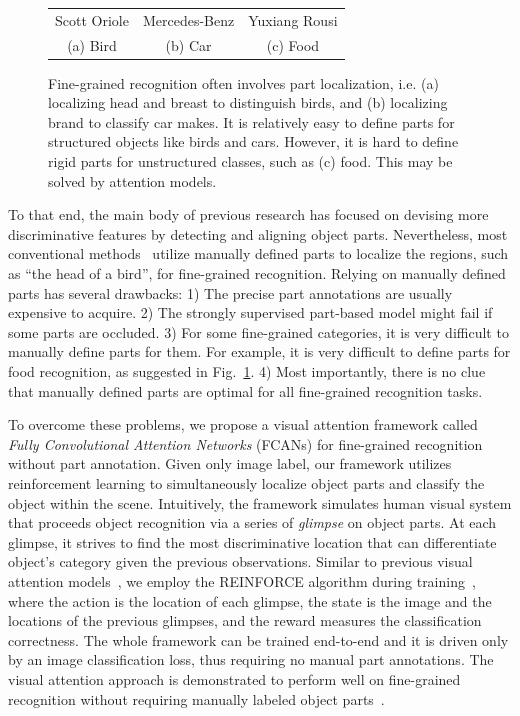 \documentclass[10pt,twocolumn,letterpaper]{article}
\begin{document}
\begin{figure}[t]
\begin{center}
\begin{tabular}{ccc}
Scott Oriole & Mercedes-Benz & Yuxiang Rousi \\
(a) Bird & (b) Car & (c) Food
\end{tabular}
\end{center}
\caption{Fine-grained recognition often involves part localization, i.e. (a) localizing head and breast to distinguish birds, and (b) localizing brand to classify car makes.
It is relatively easy to define parts for structured objects like birds and cars.
However, it is hard to define rigid parts for unstructured classes, such as (c) food.
This may be solved by attention models.
}
\label{fig:teaser2}
\end{figure}

To that end, the main body of previous research has focused on devising more discriminative features by detecting and aligning object parts.
Nevertheless, most conventional methods~\cite{bd10,bd15} utilize manually defined parts to localize the regions, such as ``the head of a bird'', for fine-grained recognition.
Relying on manually defined parts has several drawbacks:
1) The precise part annotations are usually expensive to acquire.
2) The strongly supervised part-based model might fail if some parts are occluded.
3) For some fine-grained categories, it is very difficult to manually define parts for them.
For example, it is very difficult to define parts for food recognition, as suggested in Fig.~\ref{fig:teaser2}.
4) Most importantly, there is no clue that manually defined parts are optimal for all fine-grained recognition tasks.

To overcome these problems, we propose a visual attention framework called {\em Fully Convolutional Attention Networks} (FCANs) for fine-grained recognition without part annotation.
Given only image label, our framework utilizes reinforcement learning to simultaneously localize object parts and classify the object within the scene.
Intuitively, the framework simulates human visual system that proceeds object recognition via a series of {\em glimpse} on object parts.
At each glimpse, it strives to find the most discriminative location that can differentiate object's category given the previous observations.
Similar to previous visual attention models~\cite{bd1,bd3}, we employ the REINFORCE algorithm during training~\cite{bd20}, where the action is the location of each glimpse, the state is the image and the locations of the previous glimpses, and the reward measures the classification correctness.
The whole framework can be trained end-to-end and it is driven only by an image classification loss, thus requiring no manual part annotations.
The visual attention approach is demonstrated to perform well on fine-grained recognition without requiring manually labeled object parts~\cite{bd3}.
\end{document}
